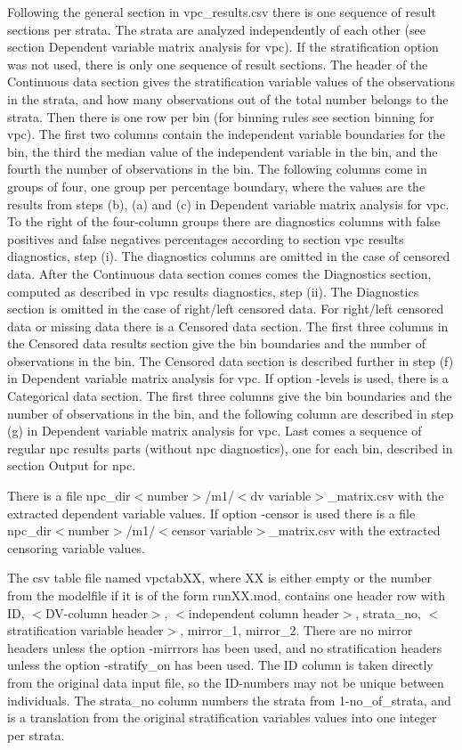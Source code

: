 Following the general section in vpc\_results.csv there is one sequence of result sections per strata. The strata are analyzed independently of each other (see section Dependent variable matrix analysis for vpc). If the stratification option was not used, there is only one sequence of result sections. The header of the Continuous data section gives the stratification variable values of the observations in the strata, and how many observations out of the total number belongs to the strata. Then there is one row per bin (for binning rules see section binning for vpc). The first two columns contain the independent variable boundaries for the bin, the third the median value of the independent variable in the bin, and the fourth the number of observations in the bin. 
The following columns come in groups of four, one group per percentage boundary, where the values are the results from steps (b), (a) and (c) in Dependent variable matrix analysis for vpc. To the right of the four-column groups there are diagnostics columns with false positives and false negatives percentages according to section vpc results diagnostics, step (i). The diagnostics columns are omitted in the case of censored data. After the Continuous data section comes comes the Diagnostics section, computed as described in vpc results diagnostics, step (ii). The Diagnostics section is omitted in the case of right/left censored data. For right/left censored data or missing data there is a Censored data section. The first three columns in the Censored data results section give the bin boundaries and the number of observations in the bin. The Censored data section is described further in step (f) in Dependent variable matrix analysis for vpc. If option -levels is used, there is a Categorical data section. The first three columns give the bin boundaries and the number of observations in the bin, and the following column are described in step (g) in Dependent variable matrix analysis for vpc. Last comes a sequence of regular npc results parts (without npc diagnostics), one for each bin, described in section Output for npc. 

There is a file npc\_dir$<$number$>$/m1/$<$dv variable$>$\_matrix.csv with the extracted dependent variable values. If option -censor is used there is a file npc\_dir$<$number$>$/m1/$<$censor variable$>$\_matrix.csv with the extracted censoring variable values.

The csv table file named vpctabXX, where XX is either empty or the number from the modelfile if it is of the form runXX.mod, contains one header row with ID, $<$DV-column header$>$, $<$independent column header$>$, strata\_no, $<$stratification variable header$>$, mirror\_1, mirror\_2. There are no mirror headers unless the option -mirrrors has been used, and no stratification headers unless the option -stratify\_on has been used. The ID column is taken directly from the original data input file, so the ID-numbers may not be unique between individuals. The strata\_no column numbers the strata from 1-no\_of\_strata, and is a translation from the original stratification variables values into one integer per strata.

